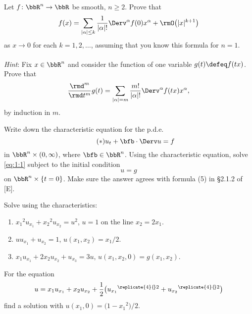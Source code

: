 \begin{problem}
  Let \(f\colon\bbR^n\to\bbR\) be smooth, \(n\geq 2\). Prove that
  \[
    f(x)=\sum_{|\alpha|\leq k}
    \frac{1}{|\alpha|!}\Derv^\alpha f(0)x^\alpha+\rmO\bigl( |x|^{k+1} \bigr)
  \]
  as \(x\to 0\) for each \(k=1,2,\dotsc\), assuming that you know this
  formula for \(n=1\).
  \\\\
  \emph{Hint}: Fix \(x\in\bbR^n\) and consider the function of one variable
  \(g(t)\defeq f(tx)\). Prove that
  \[
    \frac{\rmd^m}{\rmd t^m}g(t)
    =\sum_{|\alpha|=m}\frac{m!}{|\alpha|!} \Derv^\alpha f(tx)x^\alpha,
  \]
  by induction in \(m\).
\end{problem}
\begin{solution}
\end{solution}
\newpage

\begin{problem}
  Write down the characteristic equation for the p.d.e.\@
  \[
    \label{eq:1:1}
    \tag{\(*\)}
    u_t+\bfb\cdot\Derv u=f
  \]
  in \(\bbR^n\times(0,\infty)\), where \(\bfb\in\bbR^n\). Using the
  characteristic equation, solve \eqref{eq:1:1} subject to the initial
  condition
  \[
    u=g
  \]
  on \(\bbR^n\times\{t=0\}\). Make sure the answer agrees with formula (5)
  in \S 2.1.2 of [E].
\end{problem}
\begin{solution}

\end{solution}
\newpage

\begin{problem}
  Solve using the characteristics:
  \begin{enumerate}[label=(\alph*)]
  \item \({x_1}^{\!2}u_{x_1}+{x_2}^{\!2}u_{x_2}=u^2\), \(u=1\) on the line
    \(x_2=2x_1\).
  \item \(uu_{x_1}+u_{x_2}=1\), \(u(x_1,x_2)=x_1/2\).
  \item \(x_1u_{x_1}+2x_2u_{x_2}+u_{x_3}=3u\),
    \(u(x_1,x_2,0)=g(x_1,x_2)\).
  \end{enumerate}
\end{problem}
\begin{solution}

\end{solution}
\newpage

\begin{problem}
  For the equation
  \[
    u=x_1u_{x_1}+x_2u_{x_2}
    +\frac{1}{2}\bigl({u_{x_1}}^{\replicate{4}{\!}2}+{u_{x_2}}^{\replicate{4}{\!}2}\bigr)
  \]
  find a solution with \(u(x_1,0)=\bigl(1-{x_1}^{\!2}\bigr)/2\).
\end{problem}
\begin{solution}

\end{solution}

